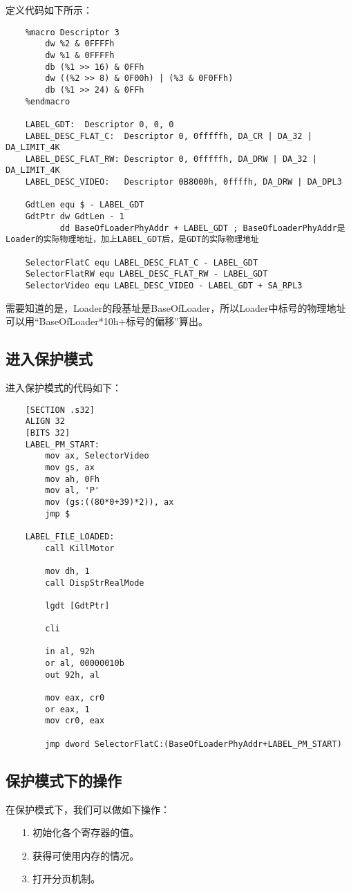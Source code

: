 \documentclass[a4paper,left=2.5cm,right=2.5cm,11pt]{article}
\begin{document}
	定义代码如下所示：
	\begin{lstlisting}
	%macro Descriptor 3
		dw %2 & 0FFFFh
		dw %1 & 0FFFFh
		db (%1 >> 16) & 0FFh
		dw ((%2 >> 8) & 0F00h) | (%3 & 0F0FFh)
		db (%1 >> 24) & 0FFh
	%endmacro

	LABEL_GDT:	Descriptor 0, 0, 0
	LABEL_DESC_FLAT_C:	Descriptor 0, 0fffffh, DA_CR | DA_32 | DA_LIMIT_4K
	LABEL_DESC_FLAT_RW:	Descriptor 0, 0fffffh, DA_DRW | DA_32 | DA_LIMIT_4K
	LABEL_DESC_VIDEO:	Descriptor 0B8000h, 0ffffh, DA_DRW | DA_DPL3

	GdtLen equ $ - LABEL_GDT
	GdtPtr dw GdtLen - 1
		   dd BaseOfLoaderPhyAddr + LABEL_GDT ; BaseOfLoaderPhyAddr是Loader的实际物理地址，加上LABEL_GDT后，是GDT的实际物理地址

	SelectorFlatC equ LABEL_DESC_FLAT_C - LABEL_GDT
	SelectorFlatRW equ LABEL_DESC_FLAT_RW - LABEL_GDT
	SelectorVideo equ LABEL_DESC_VIDEO - LABEL_GDT + SA_RPL3
	\end{lstlisting}

	需要知道的是，Loader的段基址是BaseOfLoader，所以Loader中标号的物理地址可以用“BaseOfLoader*10h+标号的偏移”算出。

\subsection{进入保护模式}
	进入保护模式的代码如下：
	\begin{lstlisting}
	[SECTION .s32]
	ALIGN 32
	[BITS 32]
	LABEL_PM_START:
		mov ax, SelectorVideo
		mov gs, ax
		mov ah, 0Fh
		mov al, 'P'
		mov (gs:((80*0+39)*2)), ax
		jmp $

	LABEL_FILE_LOADED:
		call KillMotor

		mov dh, 1
		call DispStrRealMode

		lgdt [GdtPtr]

		cli

		in al, 92h
		or al, 00000010b
		out 92h, al

		mov eax, cr0
		or eax, 1
		mov cr0, eax

		jmp dword SelectorFlatC:(BaseOfLoaderPhyAddr+LABEL_PM_START)
	\end{lstlisting}

\subsection{保护模式下的操作}
	在保护模式下，我们可以做如下操作：
	\begin{itemize}
		\item[1.] 初始化各个寄存器的值。
		\item[2.] 获得可使用内存的情况。
		\item[3.] 打开分页机制。
	\end{itemize}
\end{document}
